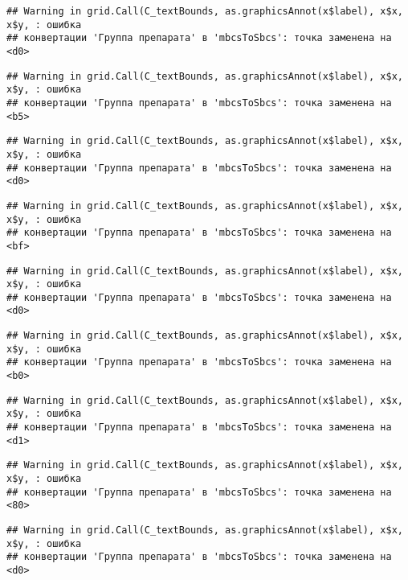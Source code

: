 \documentclass[
]{article}
\begin{document}
\begin{verbatim}
## Warning in grid.Call(C_textBounds, as.graphicsAnnot(x$label), x$x, x$y, : ошибка
## конвертации 'Группа препарата' в 'mbcsToSbcs': точка заменена на <d0>
\end{verbatim}

\begin{verbatim}
## Warning in grid.Call(C_textBounds, as.graphicsAnnot(x$label), x$x, x$y, : ошибка
## конвертации 'Группа препарата' в 'mbcsToSbcs': точка заменена на <b5>
\end{verbatim}

\begin{verbatim}
## Warning in grid.Call(C_textBounds, as.graphicsAnnot(x$label), x$x, x$y, : ошибка
## конвертации 'Группа препарата' в 'mbcsToSbcs': точка заменена на <d0>
\end{verbatim}

\begin{verbatim}
## Warning in grid.Call(C_textBounds, as.graphicsAnnot(x$label), x$x, x$y, : ошибка
## конвертации 'Группа препарата' в 'mbcsToSbcs': точка заменена на <bf>
\end{verbatim}

\begin{verbatim}
## Warning in grid.Call(C_textBounds, as.graphicsAnnot(x$label), x$x, x$y, : ошибка
## конвертации 'Группа препарата' в 'mbcsToSbcs': точка заменена на <d0>
\end{verbatim}

\begin{verbatim}
## Warning in grid.Call(C_textBounds, as.graphicsAnnot(x$label), x$x, x$y, : ошибка
## конвертации 'Группа препарата' в 'mbcsToSbcs': точка заменена на <b0>
\end{verbatim}

\begin{verbatim}
## Warning in grid.Call(C_textBounds, as.graphicsAnnot(x$label), x$x, x$y, : ошибка
## конвертации 'Группа препарата' в 'mbcsToSbcs': точка заменена на <d1>
\end{verbatim}

\begin{verbatim}
## Warning in grid.Call(C_textBounds, as.graphicsAnnot(x$label), x$x, x$y, : ошибка
## конвертации 'Группа препарата' в 'mbcsToSbcs': точка заменена на <80>
\end{verbatim}

\begin{verbatim}
## Warning in grid.Call(C_textBounds, as.graphicsAnnot(x$label), x$x, x$y, : ошибка
## конвертации 'Группа препарата' в 'mbcsToSbcs': точка заменена на <d0>
\end{verbatim}
\end{document}
